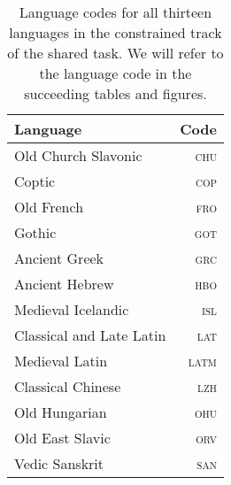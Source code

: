 \documentclass{../acl_latex.tex}
\begin{document}
\begin{table}[t]
    \centering
    \begin{tabular}{lr}
        \toprule
        Language                 & Code          \\ \midrule
        Old Church Slavonic      & \textsc{chu}  \\
        Coptic                   & \textsc{cop}  \\
        Old French               & \textsc{fro}  \\
        Gothic                   & \textsc{got}  \\
        Ancient Greek            & \textsc{grc}  \\
        Ancient Hebrew           & \textsc{hbo}  \\
        Medieval Icelandic       & \textsc{isl}  \\
        Classical and Late Latin & \textsc{lat}  \\
        Medieval Latin           & \textsc{latm} \\
        Classical Chinese        & \textsc{lzh}  \\
        Old Hungarian            & \textsc{ohu}  \\
        Old East Slavic          & \textsc{orv}  \\
        Vedic Sanskrit           & \textsc{san}  \\ \bottomrule
    \end{tabular}
    \caption{
        Language codes for all thirteen languages in the constrained track of the shared task.
        We will refer to the language code in the succeeding tables and figures.
    }
    \label{table:lang_to_code}
\end{table}
\end{document}
